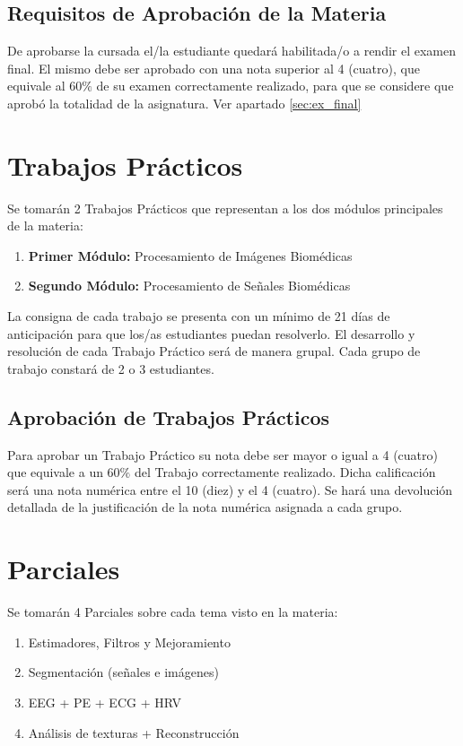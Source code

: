 \documentclass[10pt]{article}
\begin{document}
\subsection{Requisitos de Aprobación de la Materia}

De aprobarse la cursada el/la estudiante quedará habilitada/o a rendir el examen final. El mismo debe ser aprobado con una nota superior al 4 (cuatro), que equivale al $60\%$ de su examen correctamente realizado, para que se considere que aprobó la totalidad de la asignatura. Ver apartado \ref{sec:ex_final}

\section{Trabajos Prácticos}

Se tomarán 2 Trabajos Prácticos que representan a los dos módulos principales de la materia:

\begin{enumerate}
    \item \textbf{Primer Módulo:} Procesamiento de Imágenes Biomédicas
    \item \textbf{Segundo Módulo:} Procesamiento de Señales Biomédicas
\end{enumerate}

La consigna de cada trabajo se presenta con un mínimo de 21 días de anticipación para que los/as estudiantes puedan resolverlo. El desarrollo y resolución de cada Trabajo Práctico será de manera grupal. Cada grupo de trabajo constará de 2 o 3 estudiantes.

\subsection{Aprobación de Trabajos Prácticos}
\label{sec:aprobacion_tps}
Para aprobar un Trabajo Práctico su nota debe ser mayor o igual a 4 (cuatro) que equivale a un $60\%$ del Trabajo correctamente realizado. Dicha calificación será una nota numérica entre el 10 (diez) y el 4 (cuatro). Se hará una devolución detallada de la justificación de la nota numérica asignada a cada grupo.

\section{Parciales}

Se tomarán 4 Parciales sobre cada tema visto en la materia:

\begin{enumerate}
    \item Estimadores, Filtros y Mejoramiento
    \item Segmentación (señales e imágenes)
    \item EEG + PE + ECG + HRV
    \item Análisis de texturas + Reconstrucción
    
\end{enumerate}
\end{document}

